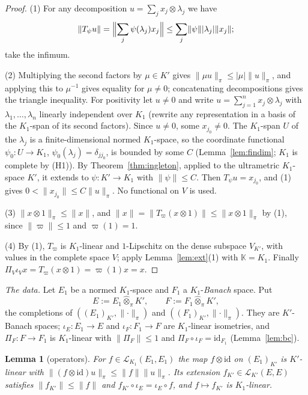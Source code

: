 \documentclass[11pt]{amsart}
\newtheorem{lemma}[theorem]{Lemma}
\theoremstyle{definition}
\theoremstyle{remark}
\numberwithin{equation}{section}
\newcommand{\cL}{\mathcal{L}}
\newcommand{\id}{\mathrm{id}}
\newcommand{\abs}[1]{\lvert #1\rvert}
\newcommand{\norm}[1]{\lVert #1\rVert}
\begin{document}
\begin{proof}
(1) For any decomposition $u=\sum_jx_j\otimes\lambda_j$ we have
\[
\norm{T_\psi u}=\Bigl\lVert\sum_j\psi(\lambda_j)x_j\Bigr\rVert\le\sum_j\norm\psi\abs{\lambda_j}\norm{x_j};
\]
take the infimum.

(2) Multiplying the second factors by $\mu\in K'$ gives $\norm{\mu u}_\pi\le\abs\mu\norm u_\pi$, and applying this to
$\mu^{-1}$ gives equality for $\mu\ne0$; concatenating decompositions gives the triangle inequality. For positivity let
$u\neq0$ and write $u=\sum_{j=1}^nx_j\otimes\lambda_j$ with $\lambda_1,\dots,\lambda_n$ linearly independent over $K_1$
(rewrite any representation in a basis of the $K_1$\nobreakdash-span of its second factors). Since $u\ne0$, some $x_{j_0}\ne0$. The
$K_1$\nobreakdash-span $U$ of the $\lambda_j$ is a finite-dimensional normed $K_1$\nobreakdash-space, so the coordinate functional
$\psi_0\colon U\to K_1$, $\psi_0(\lambda_j)=\delta_{jj_0}$, is bounded by some $C$ (Lemma~\ref{lem:findim}; $K_1$ is complete
by (H1)). By Theorem~\ref{thm:ingleton}, applied to the ultrametric $K_1$\nobreakdash-space $K'$, it extends to $\psi\colon K'\to K_1$
with $\norm\psi\le C$. Then $T_\psi u=x_{j_0}$, and (1) gives $0<\norm{x_{j_0}}\le C\norm u_\pi$. No functional on $V$ is
used.

(3) $\norm{x\otimes1}_\pi\le\norm x$, and $\norm x=\norm{T_\varpi(x\otimes1)}\le\norm{x\otimes1}_\pi$ by (1), since
$\norm\varpi\le1$ and $\varpi(1)=1$.

(4) By (1), $T_\varpi$ is $K_1$\nobreakdash-linear and $1$\nobreakdash-Lipschitz on the dense subspace $V_{K'}$, with values in the complete space
$V$; apply Lemma~\ref{lem:ext}(1) with $\mathbb K=K_1$. Finally $\Pi_V\iota_Vx=T_\varpi(x\otimes1)=\varpi(1)x=x$.
\end{proof}

\emph{The data.} Let $E_1$ be a normed $K_1$\nobreakdash-space and $F_1$ a $K_1$\nobreakdash-\emph{Banach} space. Put
\[
E:=E_1\widehat\otimes_\pi K',\qquad F:=F_1\widehat\otimes_\pi K',
\]
the completions of $((E_1)_{K'},\norm\cdot_\pi)$ and $((F_1)_{K'},\norm\cdot_\pi)$. They are $K'$\nobreakdash-Banach spaces;
$\iota_E\colon E_1\to E$ and $\iota_F\colon F_1\to F$ are $K_1$\nobreakdash-linear isometries, and $\Pi_F\colon F\to F_1$ is $K_1$\nobreakdash-linear
with $\norm{\Pi_F}\le1$ and $\Pi_F\circ\iota_F=\id_{F_1}$ (Lemma~\ref{lem:bc}).

\begin{lemma}[operators]\label{lem:ops}
For $f\in\cL_{K_1}(E_1,E_1)$ the map $f\otimes\id$ on $(E_1)_{K'}$ is $K'$\nobreakdash-linear with
$\norm{(f\otimes\id)u}_\pi\le\norm f\norm u_\pi$. Its extension $f_{K'}\in\cL_{K'}(E,E)$ satisfies $\norm{f_{K'}}\le\norm f$
and $f_{K'}\circ\iota_E=\iota_E\circ f$, and $f\mapsto f_{K'}$ is $K_1$\nobreakdash-linear.
\end{lemma}
\end{document}
